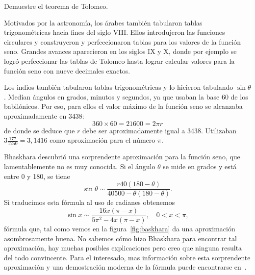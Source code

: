\begin{exercise}
	Demuestre el teorema de Tolomeo.
\end{exercise}

Motivados por la astronomía, los árabes también tabularon tablas
trigonométricas hacia fines del siglo VIII. Ellos introdujeron las funciones
circulares y construyeron y perfeccionaron tablas para los valores de la
función seno.  Grandes avances aparecieron en los siglos IX y X, donde por
ejemplo se logró perfeccionar las tablas de Tolomeo hasta lograr calcular
valores para la función seno con nueve decimales exactos. 

Los indios también tabularon tablas trigonométricas y lo hicieron tabulando
$\sin\theta$.  Medían ángulos en grados, minutos y segundos, ya que usaban la
base 60 de los babilónicos. Por eso, para ellos el valor máximo de la función
seno se alcanzaba aproximadamente en 3438:
\[
	360\times 60=21600=2\pi r
\]
de donde se deduce que $r$ debe ser aproximadamente igual a 3438. Utilizaban 
$3\frac{177}{1250}=3,1416$ como aproximación para el número $\pi$. 


Bhaskhara descubrió una sorprendente aproximación para la función seno, que
lamentablemente no es muy conocida. Si el ángulo $\theta$ se mide en grados y
está entre 0 y 180, se tiene
\[
	\sin\theta\sim \frac{r40(180-\theta)}{40500-\theta(180-\theta)}.
\]
Si traducimos esta fórmula al uso de radianes obtenemos
\[
	\sin x\sim\frac{16x(\pi-x)}{5\pi^2-4x(\pi-x)},\quad 0<x<\pi,
\]
fórmula que, tal como vemos en la figura~\ref{fig:baskhara} da una aproximación
asombrosamente buena.  No sabemos cómo hizo Bhaskhara para encontrar tal
aproximación, hay muchas posibles explicaciones pero creo que ninguna resulta
del todo convincente. Para el interesado, mas información sobre esta
sorprendente aproximación y una demostración moderna de la fórmula puede
encontrarse en~\cite{MR1108101,MR2793182}.

